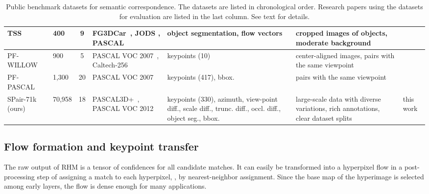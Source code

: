 \documentclass[10pt,twocolumn,letterpaper]{article}
\begin{document}
\begin{center}
\begin{table*}
{\begin{tabular}{C{3.15cm}|C{1.65cm}|c|C{3.5cm}|C{4.2cm}|C{4cm}|C{3cm}}
         \hline
         TSS~\cite{taniai2016joint} &  400 &   9  & FG3DCar~\cite{lin2014jointly}, JODS \cite{rubinstein2013unsupervised}, PASCAL~\cite{hariharan2011semantic} &  object segmentation, flow vectors &  cropped images of objects, moderate background & ~\cite{cho2015unsupervised,ham2016proposal,jeon2018parn,NIPS2018_7851,kim2017fcss,kim2017dctm,laskar2019semantic,Rocco17,Rocco18,paul2018attentive}  \\
         \hline
         PF-WILLOW~\cite{ham2016proposal} &   900 & 5 &  PASCAL VOC 2007~\cite{everingham2015pascal}, Caltech-256~\cite{cho2013learning, griffin2007caltech} &  keypoints (10) & center-aligned images, pairs with the same viewpoint & ~\cite{ham2016proposal,han2017scnet,NIPS2018_7851,kim2017fcss,kim2017dctm,novotny2017anchornet,Rocco17,paul2018attentive,ufer2017deep} \\
         \hline
         PF-PASCAL~\cite{ham2018proposal}  &  1,300  & 20 & PASCAL VOC 2007~\cite{everingham2015pascal} &  keypoints (417), bbox. & pairs with the same viewpoint & ~\cite{ham2016proposal,han2017scnet,jeon2018parn,NIPS2018_7851,laskar2019semantic,novotny2018self,Rocco17,Rocco18,rocco2018neighbourhood,paul2018attentive} \\
         \hline\hline
         SPair-71k (ours)  &   70,958 & 18 & PASCAL3D+~\cite{Xiang2014BeyondPA}, PASCAL VOC 2012~\cite{everingham2015pascal} & keypoints (330), azimuth, view-point diff., scale diff., trunc. diff., occl. diff., object seg., bbox. & large-scale data with diverse variations, rich annotations, clear dataset splits &  this work\\
         \hline
    \end{tabular} 
    }
    \vspace{-3.0mm} 
    \caption{Public benchmark datasets for semantic correspondence.  The datasets are listed in chronological order. Research papers using the datasets for evaluation are listed in the last column. See text for details.}
    \vspace{-5.0mm} 
    \label{tab:benchmark_survey}
\end{table*}
\end{center}

\vspace{-11.0mm}
\subsection{Flow formation and keypoint transfer}
The raw output of RHM is a tensor of confidences for all candidate matches. It can easily be transformed into a hyperpixel flow in a post-processing step of assigning a match to each hyperpixel, \eg, by nearest-neighbor assignment.
Since the base map of the hyperimage is selected among early layers, the flow is dense enough for many applications. 
\end{document}
